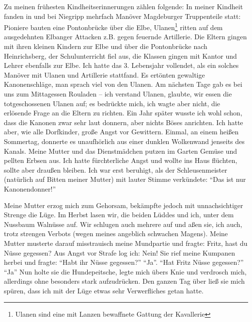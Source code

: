 \documentclass[a5paper,pagesize,10pt,twoside=true]{scrbook}
\begin{document}
\label{para:kindheitserinnerungen}Zu meinen frühesten Kindheitserinnerungen zählen folgende: In meiner Kindheit fanden in und bei Niegripp mehrfach Manöver Magdeburger Truppenteile statt: Pioniere bauten eine Pontonbrücke über die Elbe, Ulanen\footnote{Ulanen sind eine mit Lanzen bewaffnete Gattung der Kavallerie} ritten auf dem ausgedehnten Elbanger Attacken z.B. gegen feuernde Artillerie. Die Eltern gingen mit ihren kleinen Kindern zur Elbe und über die Pontonbrücke nach Heinrichsberg, der Schulunterricht fiel aus, die Klassen gingen mit Kantor und Lehrer ebenfalls zur Elbe. Ich hatte das 3. Lebensjahr vollendet, als ein solches Manöver mit Ulanen und Artillerie stattfand. Es ertönten gewaltige Kanonenschläge, man sprach viel von den Ulanen. Am nächsten Tage gab es bei uns zum Mittagessen Rouladen -- ich verstand Ulanen, glaubte, wir essen die totgeschossenen Ulanen auf; es bedrückte mich, ich wagte aber nicht, die erlösende Frage an die Eltern zu richten. Ein Jahr später wusste ich wohl schon, dass die Kanonen zwar sehr laut donnern, aber nichts Böses anrichten. Ich hatte aber, wie alle Dorfkinder, große Angst vor Gewittern. Einmal, an einem heißen Sommertag, donnerte es unaufhörlich aus einer dunklen Wolkenwand jenseits des Kanals. Meine Mutter und das Dienstmädchen putzen im Garten Gemüse und pellten Erbsen aus. Ich hatte fürchterliche Angst und wollte ins Haus flüchten, sollte aber draußen bleiben. Ich war erst beruhigt, als der Schleusenmeister (natürlich auf Bitten meiner Mutter) mit lauter Stimme verkündete: \enquote{Das ist nur Kanonendonner!}

Meine Mutter erzog mich zum Gehorsam, bekämpfte jedoch mit unnachsichtiger Strenge die Lüge. Im Herbst lasen wir, die beiden Lüddes und ich, unter dem Nussbaum Walnüsse auf. Wir schlugen auch mehrere auf und aßen sie, ich auch, trotz strengen Verbots (wegen meines angeblich schwachen Magens). Meine Mutter musterte darauf misstrauisch meine Mundpartie und fragte: Fritz, hast du Nüsse gegessen? Aus Angst vor Strafe log ich: Nein! Sie rief meine Kumpanen herbei und fragte: \enquote{Habt ihr Nüsse gegessen?} \enquote{Ja}. \enquote{Hat Fritz Nüsse gegessen?} \enquote{Ja} Nun holte sie die Hundepeitsche, legte mich übers Knie und verdrosch mich, allerdings ohne besonders stark aufzudrücken. Den ganzen Tag über ließ sie mich spüren, dass ich mit der Lüge etwas sehr Verwerfliches getan hatte.
\end{document}

